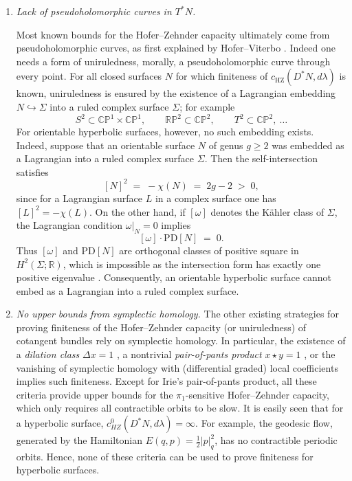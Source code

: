 \documentclass[11pt]{article}
\theoremstyle{definition}
\begin{document}
\begin{enumerate}
\item \emph{Lack of pseudoholomorphic curves in $T^{*}N$.}

Most known bounds for the Hofer--Zehnder capacity ultimately come from
pseudoholomorphic curves, as first explained by Hofer--Viterbo \cite{HV92}.
Indeed one needs a form of uniruledness, morally, a
pseudoholomorphic curve through every point. For all closed surfaces $N$
for which finiteness of $c_{\mathrm{HZ}}(D^{*}N,d\lambda)$ is known,
uniruledness is ensured by the existence of a Lagrangian embedding
$N\hookrightarrow \Sigma$ into a ruled complex surface $\Sigma$; for example
$$
S^{2}\subset \mathbb{CP}^{1}\times\mathbb{CP}^{1},\qquad
\mathbb{RP}^{2}\subset \mathbb{CP}^{2},\qquad
T^{2}\subset \mathbb{CP}^{2},\ \ldots
$$
For orientable hyperbolic surfaces, however, no such embedding exists. Indeed, suppose that an orientable surface $N$ of genus $g\ge 2$ was embedded as a Lagrangian into a ruled complex surface $\Sigma$. Then the self-intersection satisfies
$$
[N]^{2} \;=\; -\chi(N) \;=\; 2g-2 \;>\; 0,
$$
since for a Lagrangian surface $L$ in a complex surface one has $[L]^{2}=-\chi(L)$. On the other hand, if $[\omega]$ denotes the Kähler class of $\Sigma$, the Lagrangian condition $\omega|_{N}=0$ implies
$$
[\omega]\cdot \mathrm{PD}[N] \;=\; 0.
$$
Thus $[\omega]$ and $\mathrm{PD}[N]$ are orthogonal classes of positive square in $H^{2}(\Sigma;\mathbb{R})$, which is impossible as the intersection form has exactly one positive eigenvalue \cite[Prop.\ III.18]{Bea96}. Consequently, an orientable hyperbolic surface cannot embed as a Lagrangian into a ruled complex surface.

\item \emph{No upper bounds from symplectic homology.}
The other existing strategies for proving finiteness of the Hofer--Zehnder capacity (or uniruledness) of cotangent bundles rely on symplectic homology. 
In particular, the existence of a \textit{dilation class} $\Delta x = 1$ \cite{BC25}, 
a nontrivial \textit{pair-of-pants product} $x \star y = 1$ \cite{Iri14}, 
or the vanishing of symplectic homology with (differential graded) local coefficients \cite{AFO17,BDHO-cotangent} implies such finiteness. Except for Irie's pair-of-pants product, all these criteria provide upper bounds for the $\pi_1$-sensitive Hofer--Zehnder capacity, which only requires all contractible orbits to be slow. 
It is easily seen that for a hyperbolic surface, $c_{HZ}^0(D^*N, d\lambda)=\infty$. For example, the geodesic flow, generated by the Hamiltonian $E(q,p)=\tfrac{1}{2}\lvert p\rvert_q^2$, has no contractible periodic orbits. Hence, none of these criteria can be used to prove finiteness for hyperbolic surfaces.\\


\end{enumerate}
\end{document}

